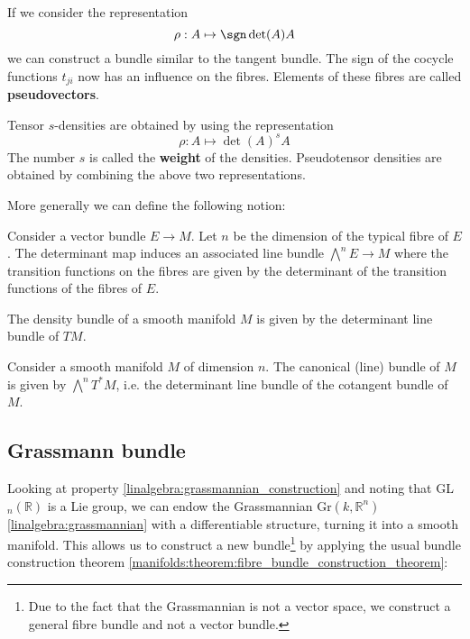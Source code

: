 	\begin{example}[Pseudovectors]
		If we consider the representation
		\begin{equation}
			\rho:A\mapsto \sgn\det(A)A
		\end{equation}
		we can construct a bundle similar to the tangent bundle. The sign of the cocycle functions $t_{ji}$ now has an influence on the fibres. Elements of these fibres are called \textbf{pseudovectors}.
	\end{example}
	\begin{example}
		Tensor $s$-densities are obtained by using the representation
		\begin{equation}
			\rho:A\mapsto \det(A)^sA
		\end{equation}
		The number $s$ is called the \textbf{weight} of the densities. Pseudotensor densities are obtained by combining the above two representations.
	\end{example}
	
	More generally we can define the following notion:
	\begin{construct}
		Consider a vector bundle $E\rightarrow M$. Let $n$ be the dimension of the typical fibre of $E$. The determinant map induces an associated line bundle $\bigwedge^nE\rightarrow M$ where the transition functions on the fibres are given by the determinant of the transition functions of the fibres of $E$.
	\end{construct}
	\begin{result}
		The density bundle of a smooth manifold $M$ is given by the determinant line bundle of $TM$.
	\end{result}
	
	\begin{example}
		Consider a smooth manifold $M$ of dimension $n$. The canonical (line) bundle of $M$ is given by $\bigwedge^nT^*M$, i.e. the determinant line bundle of the cotangent bundle of $M$.
	\end{example}
	
\subsection{Grassmann bundle}

	Looking at property \ref{linalgebra:grassmannian_construction} and noting that GL$_n(\mathbb{R})$ is a Lie group, we can endow the Grassmannian Gr$(k, \mathbb{R}^n)$ \ref{linalgebra:grassmannian} with a differentiable structure, turning it into a smooth manifold. This allows us to construct a new bundle\footnote{Due to the fact that the Grassmannian is not a vector space, we construct a general fibre bundle and not a vector bundle.} by applying the usual bundle construction theorem \ref{manifolds:theorem:fibre_bundle_construction_theorem}:
	
